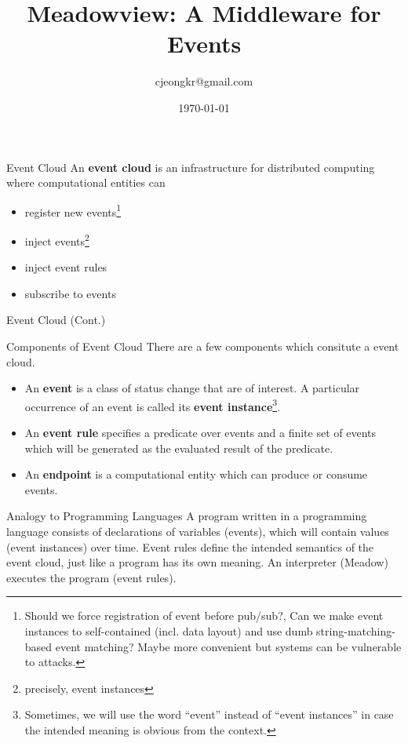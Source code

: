 \documentclass[10pt]{beamer}
\title{Meadowview: A Middleware for Events}
\author{cjeongkr@gmail.com}
\date{\today}
\begin{document}
\begin{frame}[plain]
  \titlepage
\end{frame}

\begin{frame}{Event Cloud}
An {\bf event cloud} is an infrastructure for distributed computing where
computational entities can
\begin{itemize}
\item register new events\footnote{Should we force registration of event
  before pub/sub?, Can we make event instances to self-contained (incl. data
  layout) and use dumb string-matching-based event matching? Maybe more
  convenient but systems can be vulnerable to attacks.}
\item inject events\footnote{precisely, event instances}
\item inject event rules
\item subscribe to events
\end{itemize}
\end{frame}

\begin{frame}{Event Cloud (Cont.)}
\begin{block}{Components of Event Cloud}
There are a few components which consitute a event cloud. 
\begin{itemize}
\item An {\bf event} is a class of status change that are of interest. 
  A particular occurrence of an event is called its {\bf event
    instance\/}\footnote{Sometimes, we will use the word ``event'' instead of
    ``event instances'' in case the intended meaning is obvious from the context.}.
\item An {\bf event rule\/} specifies a predicate over events and a finite set
  of events which will be generated as the evaluated result of the predicate.
\item An {\bf endpoint} is a computational entity which can produce or consume
  events.
\end{itemize}
\end{block}

\begin{block}{Analogy to Programming Languages}
A program written in a programming language consists of declarations of
variables (events), which will contain values (event instances) over
time. Event rules define the intended semantics of the event 
cloud, just like a program has its own meaning. An interpreter (Meadow)
executes the program (event rules).
\end{block}
\end{frame}
\end{document}
